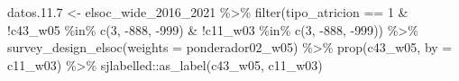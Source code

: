 \documentclass[
  12pt,
]{book}
\newenvironment{Shaded}{\begin{snugshade}}{\end{snugshade}}
\newcommand{\AttributeTok}[1]{\textcolor[rgb]{0.77,0.63,0.00}{#1}}
\newcommand{\DecValTok}[1]{\textcolor[rgb]{0.00,0.00,0.81}{#1}}
\newcommand{\FloatTok}[1]{\textcolor[rgb]{0.00,0.00,0.81}{#1}}
\newcommand{\FunctionTok}[1]{\textcolor[rgb]{0.00,0.00,0.00}{#1}}
\newcommand{\NormalTok}[1]{#1}
\newcommand{\OtherTok}[1]{\textcolor[rgb]{0.56,0.35,0.01}{#1}}
\newcommand{\SpecialCharTok}[1]{\textcolor[rgb]{0.00,0.00,0.00}{#1}}
\newcommand{\StringTok}[1]{\textcolor[rgb]{0.31,0.60,0.02}{#1}}
\begin{document}
\begin{Shaded}
\begin{Highlighting}[]
\NormalTok{datos.}\FloatTok{11.7} \OtherTok{\textless{}{-}}\NormalTok{ elsoc\_wide\_2016\_2021 }\SpecialCharTok{\%\textgreater{}\%} 
  \FunctionTok{filter}\NormalTok{(tipo\_atricion }\SpecialCharTok{==} \DecValTok{1} \SpecialCharTok{\&} \SpecialCharTok{!}\NormalTok{c43\_w05 }\SpecialCharTok{\%in\%} \FunctionTok{c}\NormalTok{(}\DecValTok{3}\NormalTok{, }\SpecialCharTok{{-}}\DecValTok{888}\NormalTok{, }\SpecialCharTok{{-}}\DecValTok{999}\NormalTok{) }\SpecialCharTok{\&} 
           \SpecialCharTok{!}\NormalTok{c11\_w03 }\SpecialCharTok{\%in\%} \FunctionTok{c}\NormalTok{(}\DecValTok{3}\NormalTok{, }\SpecialCharTok{{-}}\DecValTok{888}\NormalTok{, }\SpecialCharTok{{-}}\DecValTok{999}\NormalTok{)) }\SpecialCharTok{\%\textgreater{}\%} 
  \FunctionTok{survey\_design\_elsoc}\NormalTok{(}\AttributeTok{weights =} \StringTok{\textquotesingle{}ponderador02\_w05\textquotesingle{}}\NormalTok{) }\SpecialCharTok{\%\textgreater{}\%} 
  \FunctionTok{prop}\NormalTok{(c43\_w05, }\AttributeTok{by =}\NormalTok{ c11\_w03) }\SpecialCharTok{\%\textgreater{}\%} 
\NormalTok{  sjlabelled}\SpecialCharTok{::}\FunctionTok{as\_label}\NormalTok{(c43\_w05, c11\_w03)}


\end{Highlighting}
\end{Shaded}
\end{document}
